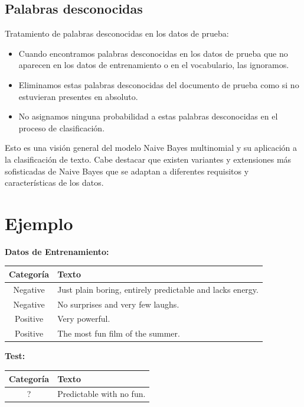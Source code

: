 \subsection{Palabras desconocidas}

Tratamiento de palabras desconocidas en los datos de prueba:
\begin{itemize}
    \item Cuando encontramos palabras desconocidas en los datos de prueba que no aparecen en los datos de entrenamiento o en el vocabulario, las ignoramos.
    \item Eliminamos estas palabras desconocidas del documento de prueba como si no estuvieran presentes en absoluto.
    \item No asignamos ninguna probabilidad a estas palabras desconocidas en el proceso de clasificación.
\end{itemize}

Esto es una visión general del modelo Naive Bayes multinomial y su aplicación a la clasificación de texto. Cabe destacar que existen variantes y extensiones más sofisticadas de Naive Bayes que se adaptan a diferentes requisitos y características de los datos.


\section{Ejemplo}

\textbf{Datos de Entrenamiento:} 

\begin{table}[h]
\centering
\begin{tabular}{|c|p{}|}
\hline
\textbf{Categoría} & \textbf{Texto} \\
\hline
Negative & Just plain boring, entirely predictable and lacks energy. \\
\hline
Negative & No surprises and very few laughs. \\
\hline
Positive & Very powerful. \\
\hline
Positive & The most fun film of the summer. \\
\hline
\end{tabular}
\end{table}


\textbf{Test:} 
\begin{table}[h]
\centering
\begin{tabular}{|c|p{}|}
\hline
\textbf{Categoría} & \textbf{Texto} \\
\hline
? & Predictable with no fun. \\
\hline
\end{tabular}
\end{table}

